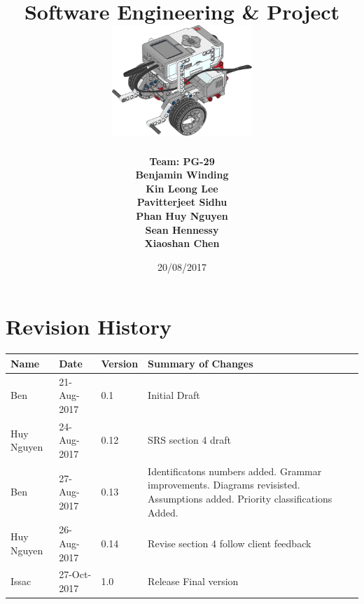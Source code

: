 \documentclass[10pt,a4paper,titlepage]{article}
\begin{document}
	
	\begin{titlepage}
		
		\title{
			\fontsize{50}{12}\\
			\vspace{20pt}
			\fontsize{20}{12}\\
			\vspace{10pt}
			\large{Software Engineering \& Project} \\
			\vspace{20pt}
			\includegraphics[width=200px]{title-page-ev3.png}					
		}
		\date{20/08/2017}
		\author{
			\bf{Team: PG-29} \\
			Benjamin Winding \\
			Kin Leong Lee \\
			Pavitterjeet Sidhu \\
			Phan Huy Nguyen \\
			Sean Hennessy \\
			Xiaoshan Chen \\
		}
		\maketitle
		
	\end{titlepage}
		 
	\tableofcontents	
	\listoffigures
	
	
	\section*{Revision History}	
	\label{revtable}	
	\begin{tabular}{|p{2.1cm}|p{2.5cm}|p{2cm}|p{4.1cm}|}		
		\hline 
		\textbf {Name} & \textbf{Date} & \textbf {Version} &\textbf {Summary of Changes} \\ 
		\hline 
		Ben & 21-Aug-2017 & 0.1 & Initial Draft\\
		\hline
		Huy Nguyen & 24-Aug-2017 & 0.12 & SRS section 4 draft\\	
		\hline
		Ben & 27-Aug-2017 & 0.13 & Identificatons numbers added. Grammar improvements. Diagrams revisisted. Assumptions added. Priority classifications Added.\\  
		\hline
		Huy Nguyen & 26-Aug-2017 & 0.14 & Revise section 4 follow client feedback\\	
		\hline
		Issac & 27-Oct-2017 & 1.0 & Release Final version\\	
		\hline 		
	\end{tabular}
\end{document}
